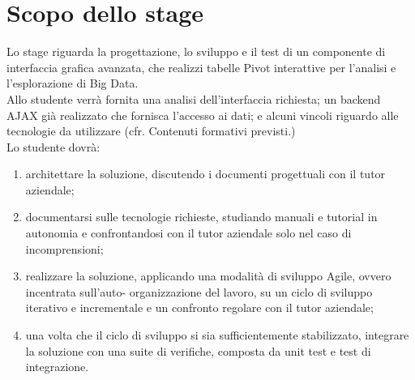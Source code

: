 \section*{Scopo dello stage}
Lo stage riguarda la progettazione, lo sviluppo e il test di un componente di interfaccia grafica avanzata, che realizzi tabelle Pivot interattive per l'analisi e l'esplorazione di Big Data. \\
Allo studente verrà fornita una analisi dell'interfaccia richiesta; un backend AJAX già realizzato che fornisca l'accesso ai dati; e alcuni vincoli riguardo alle tecnologie da utilizzare (cfr. Contenuti formativi previsti.) \\
Lo studente dovrà:
\begin{enumerate}
	\item architettare la soluzione, discutendo i documenti progettuali con il tutor aziendale;
	\item documentarsi sulle tecnologie richieste, studiando manuali e tutorial in autonomia e confrontandosi con il tutor aziendale solo nel caso di incomprensioni;
	\item realizzare la soluzione, applicando una modalità di sviluppo Agile, ovvero incentrata sull'auto- organizzazione del lavoro, su un ciclo di sviluppo iterativo e incrementale e un confronto regolare con il tutor aziendale;
	\item una volta che il ciclo di sviluppo si sia sufficientemente stabilizzato, integrare la soluzione con una suite di verifiche, composta da unit test e test di integrazione.
\end{enumerate}

